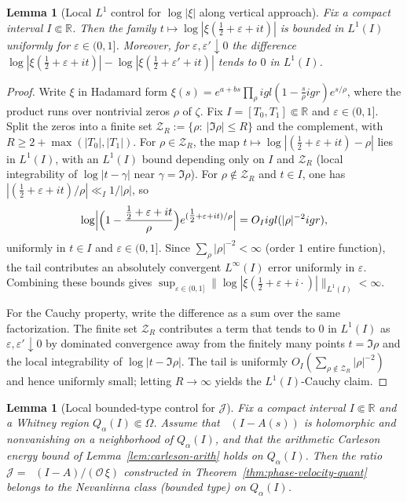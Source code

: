 \documentclass[11pt]{amsart}
\newtheorem{lemma}[theorem]{Lemma}
\theoremstyle{definition}
\theoremstyle{remark}
\newcommand{\R}{\mathbb{R}}
\DeclareMathOperator{\dettwo}{det_2}
\begin{document}
\begin{lemma}[Local $L^1$ control for $\log|\xi|$ along vertical approach]\label{lem:xi-deriv-L1}
Fix a compact interval $I\Subset\mathbb R$. Then the family
$t\mapsto \log|\xi(\tfrac12+\varepsilon+it)|$ is bounded in $L^1(I)$ uniformly for $\varepsilon\in(0,1]$.
Moreover, for $\varepsilon,\varepsilon'\downarrow 0$ the difference
$\log|\xi(\tfrac12+\varepsilon+it)|-\log|\xi(\tfrac12+\varepsilon'+it)|$ tends to $0$ in $L^1(I)$.
\end{lemma}
\begin{proof}
Write $\xi$ in Hadamard form $\xi(s)=e^{a+bs}\prod_{\rho}igl(1-\frac{s}{\rho}igr)e^{s/\rho}$, where the product runs over nontrivial zeros $\rho$ of $\zeta$.
Fix $I=[T_0,T_1]\Subset\mathbb R$ and $\varepsilon\in(0,1]$.
Split the zeros into a finite set $\mathcal Z_R:=\{\rho:\ |\Im\rho|\le R\}$ and the complement, with $R\ge 2+\max(|T_0|,|T_1|)$.
For $\rho\in\mathcal Z_R$, the map $t\mapsto \log|(\tfrac12+\varepsilon+it)-\rho|$ lies in $L^1(I)$, with an $L^1(I)$ bound depending only on $I$ and $\mathcal Z_R$ (local integrability of $\log|t-\gamma|$ near $\gamma=\Im\rho$).
For $\rho\notin\mathcal Z_R$ and $t\in I$, one has $|(\tfrac12+\varepsilon+it)/\rho|\ll_I 1/|\rho|$, so
\[
\log\Bigl|\Bigl(1-\frac{\tfrac12+\varepsilon+it}{\rho}\Bigr)e^{(\tfrac12+\varepsilon+it)/\rho}\Bigr|
=O_Iigl(|\rho|^{-2}igr),
\]
uniformly in $t\in I$ and $\varepsilon\in(0,1]$.
Since $\sum_{\rho}|\rho|^{-2}<\infty$ (order $1$ entire function), the tail contributes an absolutely convergent $L^\infty(I)$ error uniformly in $\varepsilon$.
Combining these bounds gives $\sup_{\varepsilon\in(0,1]}\|\log|\xi(\tfrac12+\varepsilon+i\cdot)|\|_{L^1(I)}<\infty$.

For the Cauchy property, write the difference as a sum over the same factorization.
The finite set $\mathcal Z_R$ contributes a term that tends to $0$ in $L^1(I)$ as $\varepsilon,\varepsilon'\downarrow 0$ by dominated convergence away from the finitely many points $t=\Im\rho$ and the local integrability of $\log|t-\Im\rho|$.
The tail is uniformly $O_I\!\left(\sum_{\rho\notin\mathcal Z_R}|\rho|^{-2}\right)$ and hence uniformly small; letting $R\to\infty$ yields the $L^1(I)$-Cauchy claim.
\end{proof}
\begin{lemma}[Local bounded-type control for $\mathcal J$]\label{lem:J-boundedtype-local}
Fix a compact interval $I\Subset\R$ and a Whitney region $Q_{\alpha}(I)\Subset\Omega$.
Assume that $\dettwo(I-A(s))$ is holomorphic and nonvanishing on a neighborhood of $Q_{\alpha}(I)$,
and that the arithmetic Carleson energy bound of Lemma~\ref{lem:carleson-arith} holds on $Q_{\alpha}(I)$.
Then the ratio
\(
\mathcal J=\dettwo(I-A)/(\mathcal O\,\xi)
\)
constructed in Theorem~\ref{thm:phase-velocity-quant} belongs to the Nevanlinna class (bounded type) on $Q_{\alpha}(I)$.
\end{lemma}
\end{document}
